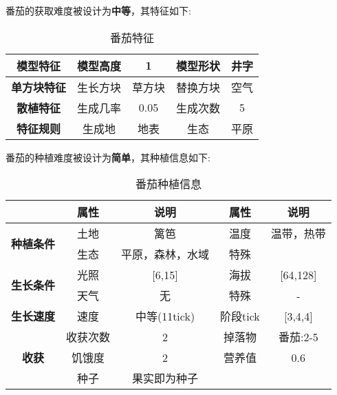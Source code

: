 番茄的获取难度被设计为\textbf{中等}，其特征如下:
\begin{table}[H]
    \centering
    \caption{番茄特征}
    \label{table:番茄特征}
    \setlength{\tabcolsep}{4mm}
    \begin{tabular}{c|cc|cc}
        \toprule
        \textbf{模型特征}   & 模型高度 & 1      & 模型形状 & 井字 \\
        \midrule
        \textbf{单方块特征} & 生长方块 & 草方块 & 替换方块 & 空气 \\
        \midrule
        \textbf{散植特征}   & 生成几率 & 0.05   & 生成次数 & 5    \\
        \midrule
        \textbf{特征规则}   & 生成地   & 地表   & 生态     & 平原 \\
        \bottomrule
    \end{tabular}
\end{table}


番茄的种植难度被设计为\textbf{简单}，其种植信息如下:

\begin{table}[H]
    \centering
    \caption{番茄种植信息}
    \label{table:番茄种植信息}
    \setlength{\tabcolsep}{4mm}
    \begin{tabular}{c|cc|cc}
        \toprule
                                           & \textbf{属性} & \textbf{说明}    & \textbf{属性} & \textbf{说明} \\
        \midrule
        \multirow{2}{*}{\textbf{种植条件}} & 土地          & 篱笆      & 温度          & 温带，热带    \\
                                           & 生态          & 平原，森林，水域 & 特殊          &          \\
        \midrule
        \multirow{2}{*}{\textbf{生长条件}} & 光照          & [6,15]           & 海拔          & [64,128]      \\
                                           & 天气          & 无               & 特殊          & -             \\
        \midrule
        \textbf{生长速度}                  & 速度          & 中等(11tick)     & 阶段tick      & [3,4,4]       \\
        \midrule
        \multirow{3}{*}{\textbf{收获}}     & 收获次数      & 2                & 掉落物        & 番茄:2-5      \\
                                           & 饥饿度        & 2                & 营养值        & 0.6           \\
                                        & 种子 & 果实即为种子 \\
        \bottomrule
    \end{tabular}
\end{table}

